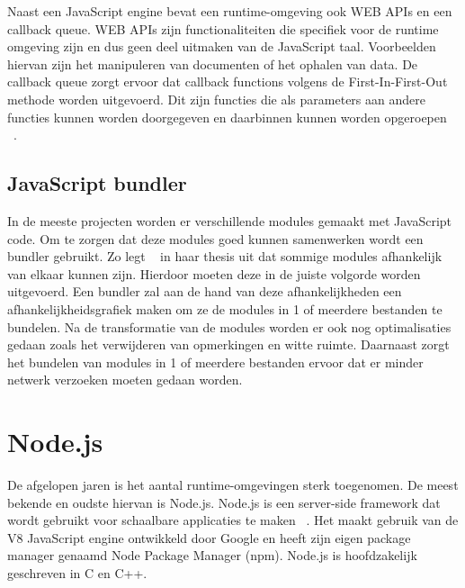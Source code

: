 Naast een JavaScript engine bevat een runtime-omgeving ook WEB APIs en een callback queue. 
WEB APIs zijn functionaliteiten die specifiek voor de runtime omgeving zijn en dus geen deel uitmaken van de JavaScript taal.
Voorbeelden hiervan zijn het manipuleren van documenten of het ophalen van data.
De callback queue zorgt ervoor dat callback functions volgens de First-In-First-Out methode worden uitgevoerd.
Dit zijn functies die als parameters aan andere functies kunnen worden doorgegeven en daarbinnen kunnen worden opgeroepen ~\autocite{Eygi2020}.

\subsection{JavaScript bundler}
In de meeste projecten worden er verschillende modules gemaakt met JavaScript code. 
Om te zorgen dat deze modules goed kunnen samenwerken wordt een bundler gebruikt. 
Zo legt ~\textcite{Laurila2020} in haar thesis uit dat sommige modules afhankelijk van elkaar kunnen zijn. 
Hierdoor moeten deze in de juiste volgorde worden uitgevoerd. Een bundler zal aan de hand van deze afhankelijkheden 
een afhankelijkheidsgrafiek maken om ze de modules in 1 of meerdere bestanden te bundelen. 
Na de transformatie van de modules worden er ook nog optimalisaties gedaan zoals het verwijderen van opmerkingen en witte ruimte.
Daarnaast zorgt het bundelen van modules in 1 of meerdere bestanden ervoor dat er minder netwerk verzoeken moeten gedaan worden.

\section{Node.js}
De afgelopen jaren is het aantal runtime-omgevingen sterk toegenomen. De meest bekende en oudste hiervan is Node.js.
Node.js is een server-side framework dat wordt gebruikt voor schaalbare applicaties te maken ~\autocite{Gackenheimer2013}.
Het maakt gebruik van de V8 JavaScript engine ontwikkeld door Google en heeft zijn eigen package manager genaamd Node Package Manager (npm).
Node.js is hoofdzakelijk geschreven in C en C++.

